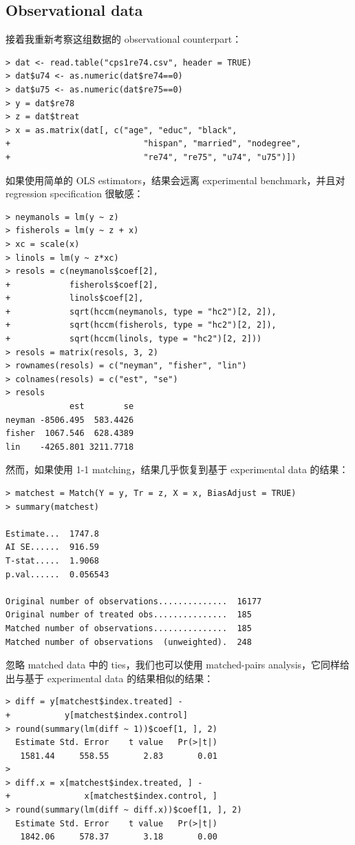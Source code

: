 \subsection{Observational data}
接着我重新考察这组数据的 observational counterpart：
\begin{lstlisting}
> dat <- read.table("cps1re74.csv", header = TRUE)
> dat$u74 <- as.numeric(dat$re74==0)
> dat$u75 <- as.numeric(dat$re75==0)
> y = dat$re78
> z = dat$treat
> x = as.matrix(dat[, c("age", "educ", "black",
+                           "hispan", "married", "nodegree",
+                           "re74", "re75", "u74", "u75")])
 \end{lstlisting} 
如果使用简单的 OLS estimators，结果会远离 experimental benchmark，并且对 regression specification 很敏感：
\begin{lstlisting}
> neymanols = lm(y ~ z)
> fisherols = lm(y ~ z + x)
> xc = scale(x)
> linols = lm(y ~ z*xc)
> resols = c(neymanols$coef[2],
+            fisherols$coef[2],
+            linols$coef[2],
+            sqrt(hccm(neymanols, type = "hc2")[2, 2]),
+            sqrt(hccm(fisherols, type = "hc2")[2, 2]),
+            sqrt(hccm(linols, type = "hc2")[2, 2]))
> resols = matrix(resols, 3, 2)
> rownames(resols) = c("neyman", "fisher", "lin")
> colnames(resols) = c("est", "se")
> resols 
             est        se
neyman -8506.495  583.4426
fisher  1067.546  628.4389
lin    -4265.801 3211.7718
  \end{lstlisting} 
  然而，如果使用 1-1 matching，结果几乎恢复到基于 experimental data 的结果：
  \begin{lstlisting}
> matchest = Match(Y = y, Tr = z, X = x, BiasAdjust = TRUE)
> summary(matchest)

Estimate...  1747.8 
AI SE......  916.59 
T-stat.....  1.9068 
p.val......  0.056543 

Original number of observations..............  16177 
Original number of treated obs...............  185 
Matched number of observations...............  185 
Matched number of observations  (unweighted).  248
   \end{lstlisting} 
   
忽略 matched data 中的 ties，我们也可以使用 matched-pairs analysis，它同样给出与基于 experimental data 的结果相似的结果：
  \begin{lstlisting}
> diff = y[matchest$index.treated] - 
+           y[matchest$index.control]
> round(summary(lm(diff ~ 1))$coef[1, ], 2)
  Estimate Std. Error    t value   Pr(>|t|) 
   1581.44     558.55       2.83       0.01 
> 
> diff.x = x[matchest$index.treated, ] - 
+               x[matchest$index.control, ]
> round(summary(lm(diff ~ diff.x))$coef[1, ], 2)
  Estimate Std. Error    t value   Pr(>|t|) 
   1842.06     578.37       3.18       0.00 
   \end{lstlisting} 
   
